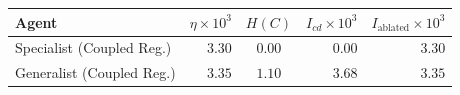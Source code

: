 \begin{tabular}{lrcrr}
\toprule
Agent & $\eta \times 10^3$ & $H(C)$ & $I_{cd} \times 10^3$ & $I_{\text{ablated}} \times 10^3$ \\
\midrule
Specialist (Coupled Reg.) & $3.30$ & $0.00$ & $0.00$ & $3.30$ \\
Generalist (Coupled Reg.) & $3.35$ & $1.10$ & $3.68$ & $3.35$ \\
\bottomrule
\end{tabular}
